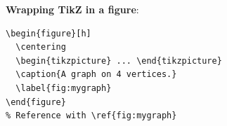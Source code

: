 \documentclass[11pt]{article}
\begin{document}
\begin{defbox}
\textbf{Wrapping TikZ in a figure}:
\begin{lstlisting}
\begin{figure}[h]
  \centering
  \begin{tikzpicture} ... \end{tikzpicture}
  \caption{A graph on 4 vertices.}
  \label{fig:mygraph}
\end{figure}
% Reference with \ref{fig:mygraph}
\end{lstlisting}
\end{defbox}
\end{document}
